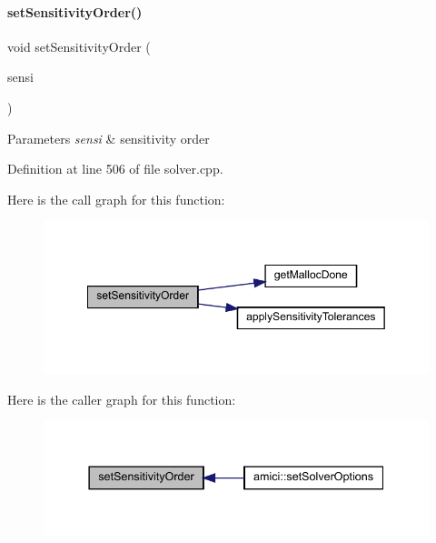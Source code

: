 \paragraph{\texorpdfstring{set\+Sensitivity\+Order()}{setSensitivityOrder()}}
{\footnotesize\ttfamily void set\+Sensitivity\+Order (\begin{DoxyParamCaption}\item[{\mbox{\hyperlink{namespaceamici_aaa03ec2f8c4d5323b98d71134a462fda}{Sensitivity\+Order}}}]{sensi }\end{DoxyParamCaption})}


\begin{DoxyParams}{Parameters}
{\em sensi} & sensitivity order \\
\hline
\end{DoxyParams}


Definition at line 506 of file solver.\+cpp.

Here is the call graph for this function\+:
\nopagebreak
\begin{figure}[H]
\begin{center}
\leavevmode
\includegraphics[width=349pt]{classamici_1_1_solver_a26129f061fdf7869be2d3e4aa22532b6_cgraph}
\end{center}
\end{figure}
Here is the caller graph for this function\+:
\nopagebreak
\begin{figure}[H]
\begin{center}
\leavevmode
\includegraphics[width=337pt]{classamici_1_1_solver_a26129f061fdf7869be2d3e4aa22532b6_icgraph}
\end{center}
\end{figure}
\mbox{\label{classamici_1_1_solver_a54fe1b062315ed19b2dbf88206415e06}} 
